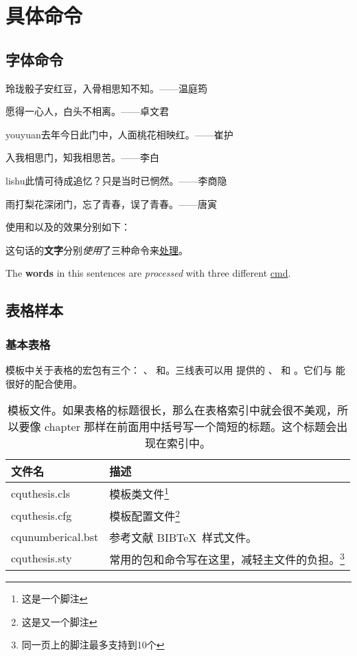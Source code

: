 \chapter{具体命令}

\section{字体命令}\label{txt:FreqCmd}
{\kaishu 玲珑骰子安红豆，入骨相思知不知。\hfill ——温庭筠}
	
{\fangsong 愿得一心人，白头不相离。\hfill ——卓文君}
		
{\ifcsname youyuan\endcsname\youyuan\else[无 \cs{youyuan} 字体。]\fi 去年今日此门中，人面桃花相映红。\hfill ——崔护}
			
{\heiti 入我相思门，知我相思苦。\hfill ——李白}
				
{\ifcsname lishu\endcsname\lishu\else[无 \cs{lishu} 字体。]\fi 此情可待成追忆？只是当时已惘然。\hfill ——李商隐}
					
{\songti 雨打梨花深闭门，忘了青春，误了青春。\hfill ——唐寅}

使用和以及的效果分别如下：

这句话的\textbf{文字}分别\textit{使用}了三种命令来\underline{处理}。

The \textbf{words} in this sentences are \textit{processed} with three different \underline{cmd}.

\section{表格样本}

\subsection{基本表格}
\label{sec:basictable}

模板中关于表格的宏包有三个： 、 和。三线表可以用 提供的 、 和 。它们与 能很好的配合使用。
\begin{table}[htb]
	\centering
	\begin{minipage}[t]{0.9\linewidth} %
	\caption[模板文件]{模板文件。如果表格的标题很长，那么在表格索引中就会很不美观，所以要像 chapter 那样在前面用中括号写一个简短的标题。这个标题会出现在索引中。}
	\label{tab:template-files}
	\begin{tabularx}{\linewidth}{lX}
		\toprule
		{\heiti 文件名} & {\heiti 描述} \\
		\midrule
		cquthesis.cls & 模板类文件\footnote{这是一个脚注}\\
		cquthesis.cfg & 模板配置文件\footnote{这是又一个脚注}\\
		cqunumberical.bst & 参考文献 BIB\TeX\ 样式文件。\\
		cquthesis.sty & 常用的包和命令写在这里，减轻主文件的负担。\footnote{同一页上的脚注最多支持到10个}\\
		\bottomrule
		\end{tabularx}
	\end{minipage}
\end{table}

